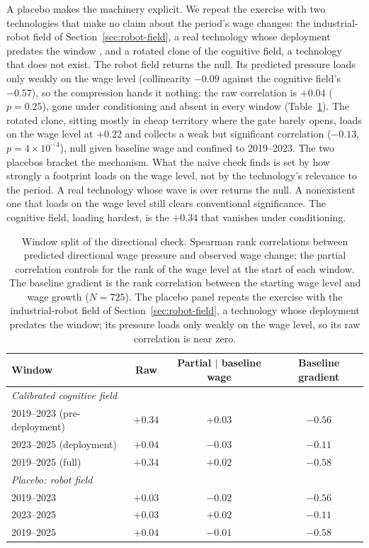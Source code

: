 \documentclass[12pt, a4paper]{article}
\begin{document}
A placebo makes the machinery explicit. We repeat the exercise with two
technologies that make no claim about the period's wage changes: the
industrial-robot field of Section~\ref{sec:robot-field}, a real
technology whose deployment predates the window
\parencite{acemoglu2020robots}, and a rotated clone of the cognitive
field, a technology that does not exist. The robot field returns the
null. Its predicted pressure loads only weakly on the wage level
(collinearity $-0.09$ against the cognitive field's $-0.57$), so the
compression hands it nothing: the raw correlation is $+0.04$ ($p=0.25$),
gone under conditioning and absent in every window
(Table~\ref{tab:window-split}). The rotated clone, sitting mostly in
cheap territory where the gate barely opens, loads on the wage level at
$+0.22$ and collects a weak but significant correlation ($-0.13$,
$p=4\times10^{-4}$), null given baseline wage and confined to
2019--2023. The two placebos bracket the mechanism. What the naive check
finds is set by how strongly a footprint loads on the wage level, not by
the technology's relevance to the period. A real technology whose wave
is over returns the null. A nonexistent one that loads on the wage level
still clears conventional significance. The cognitive field, loading
hardest, is the $+0.34$ that vanishes under conditioning.

\begin{table}[!htbp]
\centering
\caption{Window split of the directional check. Spearman rank
correlations between predicted directional wage pressure and observed
wage change; the partial correlation controls for the rank of the wage
level at the start of each window. The baseline gradient is the rank
correlation between the starting wage level and wage growth ($N=725$).
The placebo panel repeats the exercise with the industrial-robot field
of Section~\ref{sec:robot-field}, a technology whose deployment
predates the window; its pressure loads only weakly on the wage level,
so its raw correlation is near zero.}
\label{tab:window-split}
\begin{tabular}{lccc}
\toprule
Window & Raw & Partial $\mid$ baseline wage & Baseline gradient \\
\midrule
\multicolumn{4}{l}{\emph{Calibrated cognitive field}} \\
2019--2023 (pre-deployment) & $+0.34$ & $+0.03$ & $-0.56$ \\
2023--2025 (deployment) & $+0.04$ & $-0.03$ & $-0.11$ \\
2019--2025 (full) & $+0.34$ & $+0.02$ & $-0.58$ \\
\midrule
\multicolumn{4}{l}{\emph{Placebo: robot field}} \\
2019--2023 & $+0.03$ & $-0.02$ & $-0.56$ \\
2023--2025 & $+0.03$ & $+0.02$ & $-0.11$ \\
2019--2025 & $+0.04$ & $-0.01$ & $-0.58$ \\
\bottomrule
\end{tabular}
\end{table}
\end{document}
